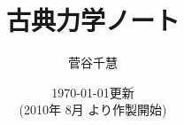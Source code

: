 ﻿%
    \title{
        \Huge{古典力学ノート}
    }

    \author{
        菅谷\;\;\;千慧
    }

    \date{
        \today \quad 更新\\
        {\small (2010年 8月 より作製開始)}
    }
    \par
